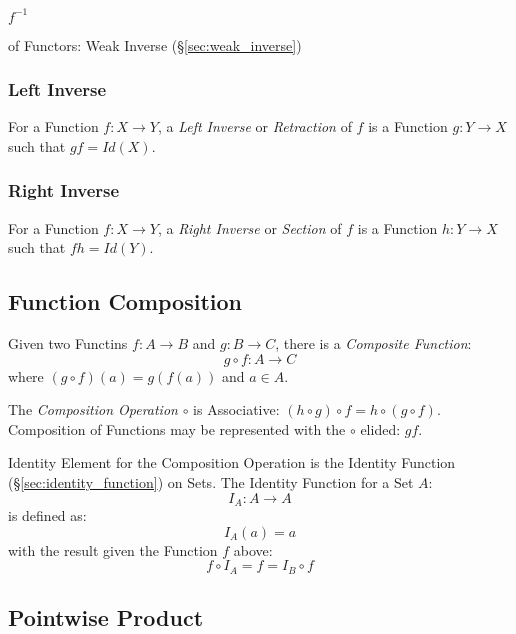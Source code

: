 $f^{-1}$


of Functors: Weak Inverse (\S\ref{sec:weak_inverse})



\subsubsection{Left Inverse}\label{sec:left_inverse}

For a Function $f: X \to Y$, a \emph{Left Inverse} or
\emph{Retraction} of $f$ is a Function $g: Y \to X$ such that
$gf = Id(X)$.



\subsubsection{Right Inverse}\label{sec:right_inverse}

For a Function $f: X \to Y$, a \emph{Right Inverse} or
\emph{Section} of $f$ is a Function $h: Y \to X$ such that $fh
= Id(Y)$.



\subsection{Function Composition}\label{sec:function_composition}

Given two Functins $f : A \to B$ and $g : B \to C$,
there is a \emph{Composite Function}:
\[
  g \circ f : A \to C
\]
where $(g \circ f)(a) = g(f(a))$ and $a \in A$.

The \emph{Composition Operation} $\circ$ is Associative: $(h \circ g)
\circ f = h \circ (g \circ f)$. Composition of Functions may be
represented with the $\circ$ elided: $gf$.

Identity Element for the Composition Operation is the Identity
Function (\S\ref{sec:identity_function}) on Sets. The Identity
Function for a Set $A$:
\[
  I_A : A \to A
\]
is defined as:
\[
  I_A(a) = a
\]
with the result given the Function $f$ above:
\[
  f \circ I_A = f = I_B \circ f
\]



\subsection{Pointwise Product}\label{sec:pointwise_product}

